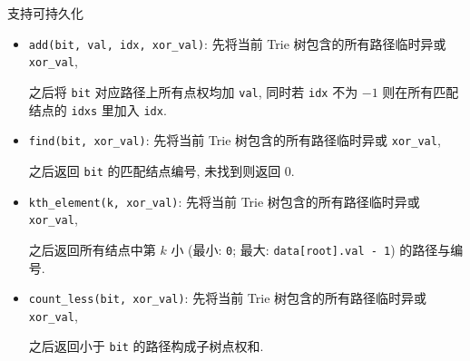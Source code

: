 支持可持久化

\begin{itemize}
    \item \verb|add(bit, val, idx, xor_val)|: 先将当前 Trie 树包含的所有路径临时异或 \verb|xor_val|,
          
          之后将 \verb|bit| 对应路径上所有点权均加 \verb|val|, 同时若 \verb|idx| 不为 \(-1\) 则在所有匹配结点的 \verb|idxs| 里加入 \verb|idx|.
          
    \item \verb|find(bit, xor_val)|: 先将当前 Trie 树包含的所有路径临时异或 \verb|xor_val|,
          
          之后返回 \verb|bit| 的匹配结点编号, 未找到则返回 \(0\).
          
    \item \verb|kth_element(k, xor_val)|: 先将当前 Trie 树包含的所有路径临时异或 \verb|xor_val|,
          
          之后返回所有结点中第 \(k\) 小 (最小: \verb|0|; 最大: \verb|data[root].val - 1|) 的路径与编号.
          
    \item \verb|count_less(bit, xor_val)|: 先将当前 Trie 树包含的所有路径临时异或 \verb|xor_val|,
          
          之后返回小于 \verb|bit| 的路径构成子树点权和.
\end{itemize}
